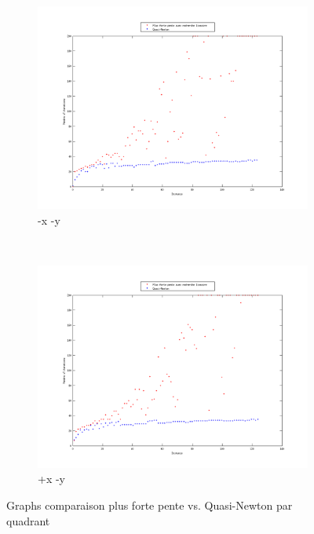 \documentclass[11pt,a4paper,twoside,onecolumn,titlepage]{report}
\begin{document}
\begin{enumerate}[(a)]
\begin{figure}[h!]
	\begin{subfigure}[t]{0.5\textwidth}
		\centering
		\includegraphics[scale=0.4]{methods-quarter-1}
		\caption{-x -y}
		\label{fig:awesome_image}
	\end{subfigure}%
        ~ %
    \begin{subfigure}[t]{0.5\textwidth}
		\centering
		\includegraphics[scale=0.4]{methods-quarter-2}
		\caption{+x -y}
		\label{fig:awesome_image}
	\end{subfigure}
    \caption{Graphs comparaison plus forte pente vs. Quasi-Newton par quadrant}\label{fig:methods-4}
\end{figure}



\end{enumerate}
\end{document}
